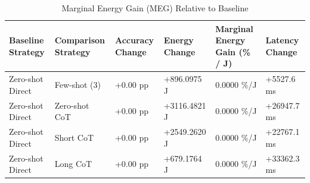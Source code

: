 \begin{table}
\caption{Marginal Energy Gain (MEG) Relative to Baseline}
\label{tab:marginal_energy_gain}
\begin{tabular}{llllll}
\toprule
Baseline Strategy & Comparison Strategy & Accuracy Change & Energy Change & Marginal Energy Gain (\% / J) & Latency Change \\
\midrule
Zero-shot Direct & Few-shot (3) & +0.00 pp & +896.0975 J & 0.0000 \%/J & +5527.6 ms \\
Zero-shot Direct & Zero-shot CoT & +0.00 pp & +3116.4821 J & 0.0000 \%/J & +26947.7 ms \\
Zero-shot Direct & Short CoT & +0.00 pp & +2549.2620 J & 0.0000 \%/J & +22767.1 ms \\
Zero-shot Direct & Long CoT & +0.00 pp & +679.1764 J & 0.0000 \%/J & +33362.3 ms \\
\bottomrule
\end{tabular}
\end{table}
